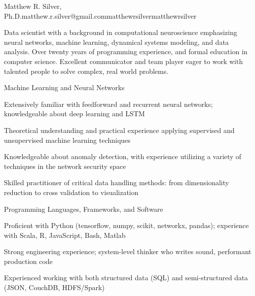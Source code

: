 \documentclass{report}
\begin{document}

  \begin{resume_header}{Matthew R. Silver, Ph.D.}{matthew.r.silver@gmail.com}{}{matthewrsilver}{matthewrsilver}

    Data scientist with a background in computational neuroscience emphasizing neural networks, machine learning, dynamical systems modeling, and data analysis. Over twenty years of programming experience, and formal education in computer science. Excellent communicator and team player eager to work with talented people to solve complex, real world problems.

  \end{resume_header}





  \begin{skillset}{Machine Learning and Neural Networks}
    \item Extensively familiar with feedforward and recurrent neural networks; knowledgeable about deep learning and LSTM
    \item Theoretical understanding and practical experience applying supervised and unsupervised machine learning techniques
    \item Knowledgeable about anomaly detection, with experience utilizing a variety of techniques in the network security space
    \item Skilled practitioner of critical data handling methods: from dimensionality reduction to cross validation to visualization
  \end{skillset}

  \begin{skillset}{Programming Languages, Frameworks, and Software}
    \item Proficient with Python (tensorflow, numpy, scikit, networkx, pandas); experience with Scala, R, JavaScript, Bash, Matlab
    \item Strong \CC{} engineering experience; system-level thinker who writes sound, performant production code
    \item Experienced working with both structured data (SQL) and semi-structured data (JSON, CouchDB, HDFS/Spark)
  \end{skillset}
\end{document}
